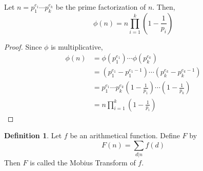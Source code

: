 \documentclass[12pt,letterpaper]{amsbook}
\theoremstyle{definition}
\newtheorem{definition}{Definition} %
\begin{document}
\begin{theorem}
  Let $n = p_1^{e_1} \cdots p_k ^{e_k}$ be the prime factorization of $n$. Then,
  \[\phi(n) = n \prod_{i=1}^k \left (1 - \frac{1}{p_i}\right)\]
\end{theorem}
\begin{proof}
  Since $\phi$ is multiplicative,
  \begin{align*}
    \phi(n) &= \phi(p_1^{e_1}) \cdots \phi(p_k^{e_k}) \\
            &= (p_1^{e_1} - p_1^{e_1-1}) \cdots (p_k^{e_k} - p_k ^{e_k-1}) \\         &= p_1^{e_1} \cdots p_k^{e_k} \left(1-\frac{1}{p_1} \right)\cdots \left (1-\frac{1}{p_k} \right) \\
            &= n \prod_{i=1}^k \left( 1-\frac{1}{p_i} \right)
  \end{align*}
\end{proof}

\begin{definition}
  Let $f$ be an arithmetical function. Define $F$ by
  \[F(n) = \sum_{d|n} f(d)\]
  Then $F$ is called the Mobius Transform of $f$.
\end{definition}
\end{document}
